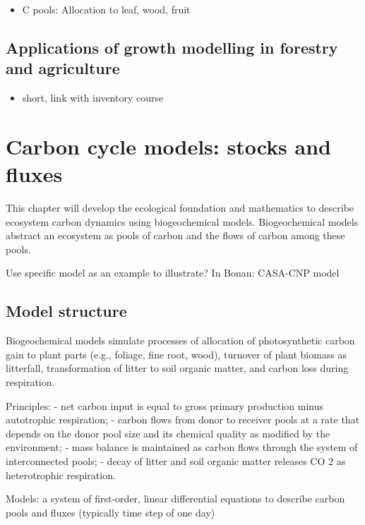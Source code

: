 \documentclass[12pt,oneside]{book}
\providecommand{\tightlist}{%
  \setlength{\itemsep}{0pt}\setlength{\parskip}{0pt}}
\begin{document}
\begin{itemize}
\tightlist
\item
  C pools: Allocation to leaf, wood, fruit
\end{itemize}

\subsection{Applications of growth modelling in forestry and
agriculture}\label{applications-of-growth-modelling-in-forestry-and-agriculture}

\begin{itemize}
\tightlist
\item
  short, link with inventory course
\end{itemize}

\section{Carbon cycle models: stocks and
fluxes}\label{carbon-cycle-models-stocks-and-fluxes}

This chapter will develop the ecological foundation and mathematics to
describe ecosystem carbon dynamics using biogeochemical models.
Biogeochemical models abstract an ecosystem as pools of carbon and the
flows of carbon among these pools.

Use specific model as an example to illustrate? In Bonan: CASA-CNP model

\subsection{Model structure}\label{model-structure}

Biogeochemical models simulate processes of allocation of photosynthetic
carbon gain to plant parts (e.g., foliage, fine root, wood), turnover of
plant biomass as litterfall, transformation of litter to soil organic
matter, and carbon loss during respiration.

Principles: - net carbon input is equal to gross primary production
minus autotrophic respiration; - carbon flows from donor to receiver
pools at a rate that depends on the donor pool size and its chemical
quality as modified by the environment; - mass balance is maintained as
carbon flows through the system of interconnected pools; - decay of
litter and soil organic matter releases CO 2 as heterotrophic
respiration.

Models: a system of first-order, linear differential equations to
describe carbon pools and fluxes (typically time step of one day)
\end{document}
